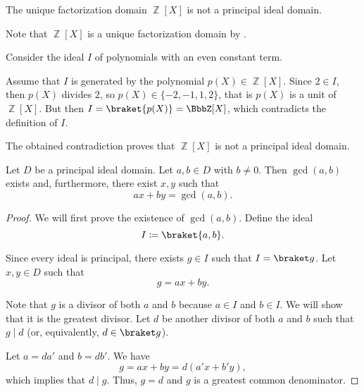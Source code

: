 \begin{example}\label{thm:ufd_is_not_pid}\cite{ProofWiki:polynomials_in_integers_is_not_principal_ideal_domain}
  The unique factorization domain \( \BbbZ[X] \) is not a principal ideal domain.

  Note that \( \BbbZ[X] \) is a unique factorization domain by .

  Consider the ideal \( I \) of polynomials with an even constant term.

  Assume that \( I \) is generated by the polynomial \( p(X) \in \BbbZ[X] \). Since \( 2 \in I \), then \( p(X) \) divides \( 2 \), so \( p(X) \in \{ -2, -1, 1, 2 \} \), that is \( p(X) \) is a unit of \( \BbbZ[X] \). But then \( I = \braket{p(X)} = \BbbZ[X] \), which contradicts the definition of \( I \).

  The obtained contradiction proves that \( \BbbZ[X] \) is not a principal ideal domain.
\end{example}

\begin{theorem}\label{thm:bezout_identity}
  Let \( D \) be a principal ideal domain. Let \( a, b \in D \) with \( b \neq 0 \). Then \( \gcd(a, b) \) exists and, furthermore, there exist \( x, y \) such that
  \begin{equation*}
    ax + by = \gcd(a, b).
  \end{equation*}
\end{theorem}
\begin{proof}
  We will first prove the existence of \( \gcd(a, b) \). Define the ideal
  \begin{equation*}
    I \coloneqq \braket{a, b}.
  \end{equation*}

  Since every ideal is principal, there exists \( g \in I \) such that \( I = \braket g \). Let \( x, y \in D \) such that
  \begin{equation*}
    g = ax + by.
  \end{equation*}

  Note that \( g \) is a divisor of both \( a \) and \( b \) because \( a \in I \) and \( b \in I \). We will show that it is the greatest divisor. Let \( d \) be another divisor of both \( a \) and \( b \) such that \( g \mid d \) (or, equivalently, \( d \in \braket g \)).

  Let \( a = da' \) and \( b = db' \). We have
  \begin{equation*}
    g = ax + by = d(a'x + b'y),
  \end{equation*}
  which implies that \( d \mid g \). Thus, \( g = d \) and \( g \) is a greatest common denominator.
\end{proof}

